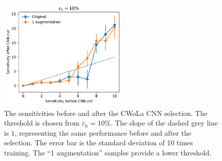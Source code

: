 \documentclass[12pt]{article}
\begin{document}
		\begin{figure}[htpb]
			\centering
			\includegraphics[width=0.55\textwidth]{HVmodel_sensitivity_improvement_bkg_eff_10_only_aug_1.pdf}
			\caption{The sensitivities before and after the CWoLa CNN selection. The threshold is chosen from $\varepsilon_{\text{b}} = 10\%$. The slope of the dashed grey line is $1$, representing the same performance before and after the selection. The error bar is the standard deviation of 10 times training. The ``1 augmentation'' samples provide a lower threshold.}
			\label{fig:sensitivity_improvement_bkg_eff_01_only_aug_1}
		\end{figure}
\end{document}
